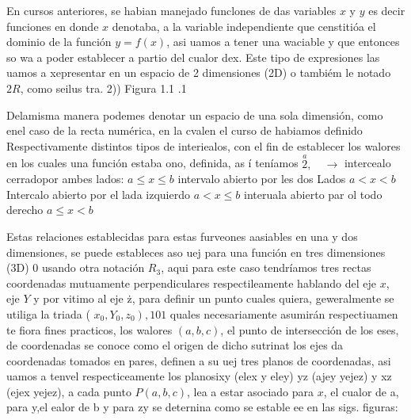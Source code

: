  
% 
% 
% 
% 



En cursos anteriores, se habian manejado funclones de das variables $x$ y $y$ es decir funciones en donde $x$ denotaba, a la variable independiente que censtitióa el dominio de la función $y=f(x)$, asi uamos a tener una waciable y que entonces so wa a poder establecer a partio del cualor dex. Este tipo de expresiones las uamos a xepresentar en un espacio de 2 dimensiones (2D) o tambiém le notado $2 R$, como seilus tra.
2))
Figura 1.1 .1

Delamisma manera podemes denotar un espacio de una
sola dimensión, como enel caso de la recta numérica, en la cvalen el curso de habiamos definido Respectivamente distintos tipos de interiealos, con el fin de establecer los walores en los cuales una función estaba ono, definida, as í teníamos
$\stackrel{a}{2}, \quad \longrightarrow$ intercealo cerradopor ambes lados: $a \leq x \leq b$
intervalo abierto por les dos Lados $a<x<b$
Intercalo abierto por el lada izquierdo $a<x \leq b$
interuala abierto par ol todo derecho $a \leq x<b$




Estas relaciones establecidas para estas furveones aasiables en una y dos dimensiones, se puede estableces aso uej para una función en tres dimensiones (3D) 0 usando otra notación $R_3$, aqui para este caso tendríamos tres rectas coordenadas mutuamente perpendiculares respectileamente hablando del eje $x$, eje $Y$ y por vitimo al eje ż, para definir un punto cuales quiera, geweralmente se utiliga la triada ( $\left.x_0, Y_0, z_0\right), 101$ quales necesariamente asumirán respectiuamen te fiora fines practicos, los walores $(a, b, c)$, el punto de intersección de los eses, de coordenadas se conoce como el origen de dicho sutrinat los ejes da coordenadas tomados en pares, definen a su uej tres planos de coordenadas, asi uamos a tenvel respecticeamente los planosixy (elex y eley) yz (ajey yejez) y xz (ejex yejez), a cada punto $P(a, b, c)$, lea a estar asociado para $x$, el cualor de a, para y,el ealor de b y para zy se deternina como se estable ee en las sigs. figuras:


